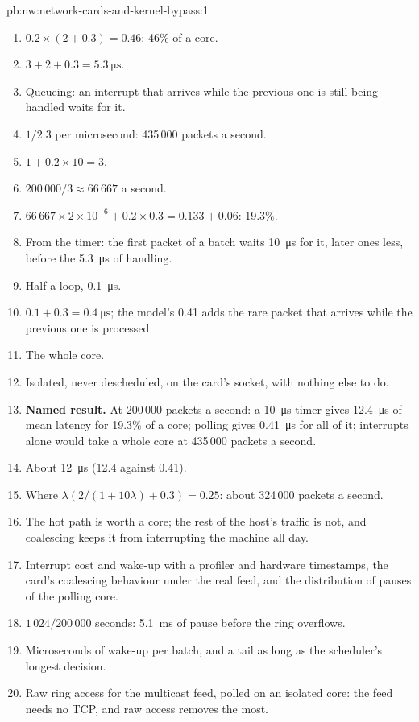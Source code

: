 \begin{solution}{pb:nw:network-cards-and-kernel-bypass:1}
\begin{enumerate}
\item $0.2 \times (2 + 0.3) = 0.46$: 46\% of a core.
\item $3 + 2 + 0.3 = \qty{5.3}{\micro\second}$.
\item Queueing: an interrupt that arrives while the previous one is still being handled waits for it.
\item $1/2.3$ per microsecond: 435\,000 packets a second.
\item $1 + 0.2 \times 10 = 3$.
\item $200\,000 / 3 \approx 66\,667$ a second.
\item $66\,667 \times 2 \times 10^{-6} + 0.2 \times 0.3 = 0.133 + 0.06$: 19.3\%.
\item From the timer: the first packet of a batch waits \qty{10}{\micro\second} for it, later ones less, before the \qty{5.3}{\micro\second}
  of handling.
\item Half a loop, \qty{0.1}{\micro\second}.
\item $0.1 + 0.3 = \qty{0.4}{\micro\second}$; the model's 0.41 adds the rare packet that arrives while the previous one is processed.
\item The whole core.
\item Isolated, never descheduled, on the card's socket, with nothing else to do.
\item \textbf{Named result.} At 200\,000 packets a second: a \qty{10}{\micro\second} timer gives \qty{12.4}{\micro\second} of mean latency
  for 19.3\% of a core; polling gives \qty{0.41}{\micro\second} for all of it; interrupts alone would take a whole core at 435\,000 packets
  a second.
\item About \qty{12}{\micro\second} (12.4 against 0.41).
\item Where $\lambda(2/(1 + 10\lambda) + 0.3) = 0.25$: about 324\,000 packets a second.
\item The hot path is worth a core; the rest of the host's traffic is not, and coalescing keeps it from interrupting the machine all day.
\item Interrupt cost and wake-up with a profiler and hardware timestamps, the card's coalescing behaviour under the real feed, and the
  distribution of pauses of the polling core.
\item $1\,024 / 200\,000$ seconds: \qty{5.1}{\milli\second} of pause before the ring overflows.
\item Microseconds of wake-up per batch, and a tail as long as the scheduler's longest decision.
\item Raw ring access for the multicast feed, polled on an isolated core: the feed needs no TCP, and raw access removes the most.
\end{enumerate}
\end{solution}

